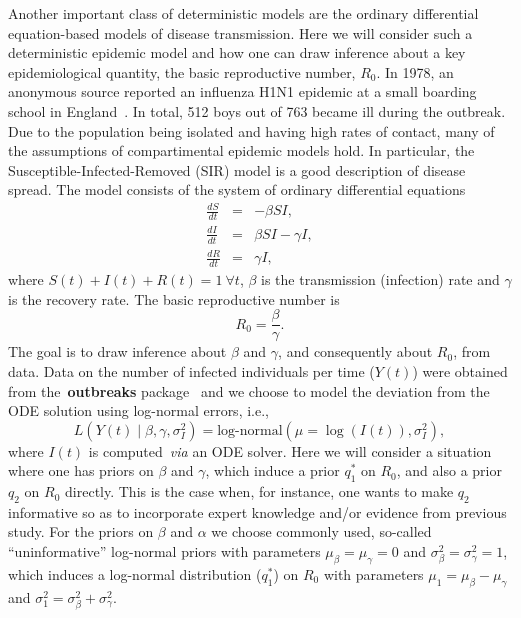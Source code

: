 \documentclass[12pt]{article}
\begin{document}
Another important class of deterministic models are the ordinary differential equation-based models of disease transmission.
Here we will consider such a deterministic epidemic model and how one can draw inference about a key epidemiological quantity, the basic reproductive number, $R_0$.
In 1978, an anonymous source reported an influenza H1N1 epidemic at a small boarding school in England~\parencite{Anonymous1978}.
In total, 512 boys out of 763 became ill during the outbreak.
Due to the population being isolated and having high rates of contact, many of the assumptions of compartimental epidemic models hold.
In particular, the Susceptible-Infected-Removed (SIR) model is a good description of disease spread.
The model consists of the system of ordinary differential equations
\begin{eqnarray*}
\frac{dS}{dt}&=& - \beta SI,\\
\frac{dI}{dt}&=&  \beta SI - \gamma I,\\
\frac{dR}{dt}&=& \gamma I, 
\end{eqnarray*} 
where  $S(t) + I(t) + R(t) = 1 \: \forall t$, $\beta$ is the transmission (infection) rate and $\gamma$ is the recovery rate.
The basic reproductive number is 
\begin{equation}
\label{eq:r0def}
R_0 = \frac{\beta}{\gamma}. 
\end{equation}
The goal is to draw inference about $\beta$ and $\gamma$, and consequently about $R_0$, from data.
Data on the number of infected individuals per time ($Y(t)$) were obtained from the~\textbf{outbreaks} package~\parencite{Outbreaks2019} and we choose to model the deviation from the ODE solution using log-normal errors, i.e.,
\begin{equation}
 \label{eq:log-normal_likelihood}
 L(Y(t)\mid \beta, \gamma, \sigma_I^2) = \text{log-normal}(\mu =  \log(I(t)), \sigma_I^2),
\end{equation}
where $I(t)$ is computed~\textit{via} an ODE solver.
Here we will consider a situation where one has priors on $\beta$ and $\gamma$, which induce a prior $q_1^\ast$ on $R_0$, and also a prior $q_2$ on $R_0$ directly.
This is the case when, for instance, one wants to make $q_2$ informative so as to incorporate expert knowledge and/or evidence from previous study.
For the priors on $\beta$ and $\alpha$ we choose commonly used, so-called ``uninformative'' log-normal priors with parameters $\mu_{\beta} = \mu_{\gamma} = 0$ and $\sigma_{\beta}^2 = \sigma_{\gamma}^2 = 1$, which induces a log-normal distribution ($q_1^\ast$) on $R_0$ with parameters $\mu_1 = \mu_\beta - \mu_\gamma$ and $\sigma_1^2 = \sigma_{\beta}^2 +  \sigma_{\gamma}^2$.
\end{document}

